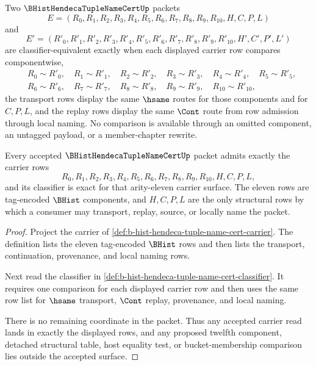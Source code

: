 \begin{definition}
\label{def:b-hist-hendeca-tuple-name-cert-classifier}
Two $\BHistHendecaTupleNameCertUp$ packets
$$
E=(R_0,R_1,R_2,R_3,R_4,R_5,R_6,R_7,R_8,R_9,R_{10},H,C,P,L)
$$
and
$$
E'=(R'_0,R'_1,R'_2,R'_3,R'_4,R'_5,R'_6,R'_7,R'_8,R'_9,R'_{10},H',C',P',L')
$$
are classifier-equivalent exactly when each displayed carrier row compares componentwise,
$$
\begin{aligned}
&R_0 \sim R'_0,\quad R_1 \sim R'_1,\quad R_2 \sim R'_2,\quad R_3 \sim R'_3,\quad R_4 \sim R'_4,\quad R_5 \sim R'_5,\\
&R_6 \sim R'_6,\quad R_7 \sim R'_7,\quad R_8 \sim R'_8,\quad R_9 \sim R'_9,\quad R_{10} \sim R'_{10},
\end{aligned}
$$
the transport rows display the same $\hsame$ routes for those components and for $C,P,L$, and the replay rows display the same $\Cont$ route from row admission through local naming. No comparison is available through an omitted component, an untagged payload, or a member-chapter rewrite.
\end{definition}

\begin{theorem}
\label{thm:b-hist-hendeca-tuple-name-cert-obligations}
Every accepted $\BHistHendecaTupleNameCertUp$ packet admits exactly the carrier rows
$$
R_0,R_1,R_2,R_3,R_4,R_5,R_6,R_7,R_8,R_9,R_{10},H,C,P,L,
$$
and its classifier is exact for that arity-eleven carrier surface. The eleven rows are tag-encoded $\BHist$ components, and $H,C,P,L$ are the only structural rows by which a consumer may transport, replay, source, or locally name the packet.
\end{theorem}
\begin{proof}
Project the carrier of \autoref{def:b-hist-hendeca-tuple-name-cert-carrier}. The definition lists the eleven tag-encoded $\BHist$ rows and then lists the transport, continuation, provenance, and local naming rows.

Next read the classifier in \autoref{def:b-hist-hendeca-tuple-name-cert-classifier}. It requires one comparison for each displayed carrier row and then uses the same row list for $\hsame$ transport, $\Cont$ replay, provenance, and local naming.

There is no remaining coordinate in the packet. Thus any accepted carrier read lands in exactly the displayed rows, and any proposed twelfth component, detached structural table, host equality test, or bucket-membership comparison lies outside the accepted surface.
\end{proof}

